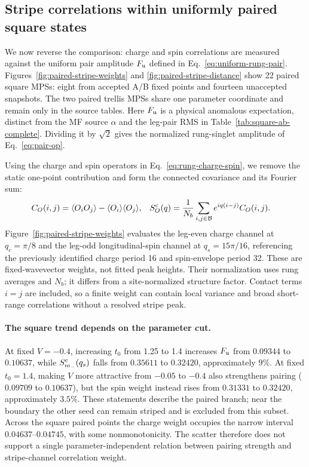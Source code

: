 \documentclass[11pt,letterpaper]{article}
\newcommand{\avg}[1]{\langle #1\rangle}
\begin{document}
\clearpage
\subsection{Stripe correlations within uniformly paired square states}
\label{sec:paired-stripe-correlations}

We now reverse the comparison: charge and spin correlations are measured
against the uniform pair amplitude $F_{\rm u}$ defined in
Eq.~\eqref{eq:uniform-rung-pair}. Figures~\ref{fig:paired-stripe-weights}
and \ref{fig:paired-stripe-distance} show 22 paired square MPSs: eight
from accepted A/B fixed points and fourteen unaccepted snapshots.
The two paired trellis MPSs share one parameter coordinate and remain
only in the source tables.
Here $F_{\rm u}$ is a physical anomalous expectation, distinct from the
MF source $\alpha$ and the leg-pair RMS in Table~\ref{tab:square-ab-complete}.
Dividing it by $\sqrt2$ gives the normalized rung-singlet amplitude of
Eq.~\eqref{eq:pair-op}.

Using the charge and spin operators in Eq.~\eqref{eq:rung-charge-spin},
we remove the static one-point contribution and form the connected
covariance and its Fourier sum:
\begin{equation}
 \begin{aligned}
 C_O(i,j)&=\avg{O_iO_j}-\avg{O_i}\avg{O_j},&
 S_O^{\rm c}(q)&=\frac{1}{N_b}\sum_{i,j\in\mathcal B}
       e^{iq(i-j)}C_O(i,j).
 \end{aligned}
 \label{eq:paired-stripe-covariance}
\end{equation}
Figure~\ref{fig:paired-stripe-weights} evaluates the leg-even charge
channel at $q_c=\pi/8$ and the leg-odd longitudinal-spin channel at
$q_s=15\pi/16$, referencing the previously identified charge period 16
and spin-envelope period 32. These are fixed-wavevector weights, not
fitted peak heights. Their normalization uses rung averages and $N_b$;
it differs from a site-normalized structure factor. Contact terms
$i=j$ are included, so a finite weight can contain local variance and
broad short-range correlations without a resolved stripe peak.

\paragraph{The square trend depends on the parameter cut.}
At fixed $V=-0.4$, increasing $t_0$ from 1.25 to 1.4 increases $F_{\rm u}$
from $0.09344$ to $0.10637$, while $S_{m_-}^{\rm c}(q_s)$ falls from
$0.35611$ to $0.32420$, approximately $9\%$. At fixed $t_0=1.4$, making
$V$ more attractive from $-0.05$ to $-0.4$ also strengthens pairing
($0.09709$ to $0.10637$), but the spin weight instead rises from
$0.31331$ to $0.32420$, approximately $3.5\%$. These statements describe
the paired branch; near the boundary the other seed can remain striped
and is excluded from this subset. Across the square paired points the
charge weight occupies the narrow interval $0.04637$--$0.04745$, with
some nonmonotonicity. The scatter therefore does not support a single
parameter-independent relation between pairing strength and stripe-channel
correlation weight.
\end{document}
